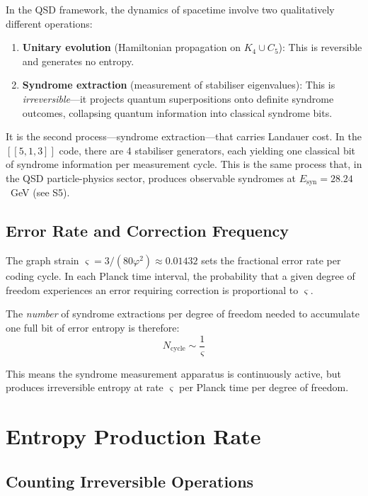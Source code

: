 \documentclass[11pt,a4paper]{article}
\theoremstyle{definition}
\newcommand{\gs}{\varsigma}                %
\newcommand{\Esyn}{E_{\text{syn}}}
\begin{document}
In the QSD framework, the dynamics of spacetime involve two qualitatively different operations:

\begin{enumerate}[nosep]
    \item \textbf{Unitary evolution} (Hamiltonian propagation on $K_4 \cup C_5$): This is reversible and generates no entropy.
    \item \textbf{Syndrome extraction} (measurement of stabiliser eigenvalues): This is \emph{irreversible}---it projects quantum superpositions onto definite syndrome outcomes, collapsing quantum information into classical syndrome bits.
\end{enumerate}

It is the second process---syndrome extraction---that carries Landauer cost. In the $[[5,1,3]]$ code, there are 4 stabiliser generators, each yielding one classical bit of syndrome information per measurement cycle. This is the same process that, in the QSD particle-physics sector, produces observable syndromes at $\Esyn = 28.24$~GeV (see S5).

\subsection{Error Rate and Correction Frequency}

The graph strain $\gs = 3/(80\varphi^2) \approx 0.01432$ sets the fractional error rate per coding cycle. In each Planck time interval, the probability that a given degree of freedom experiences an error requiring correction is proportional to $\gs$.

The \emph{number} of syndrome extractions per degree of freedom needed to accumulate one full bit of error entropy is therefore:
\begin{equation}
    N_{\text{cycle}} \sim \frac{1}{\gs}
\end{equation}

This means the syndrome measurement apparatus is continuously active, but produces irreversible entropy at rate $\gs$ per Planck time per degree of freedom.


\section{Entropy Production Rate}

\subsection{Counting Irreversible Operations}
\end{document}

